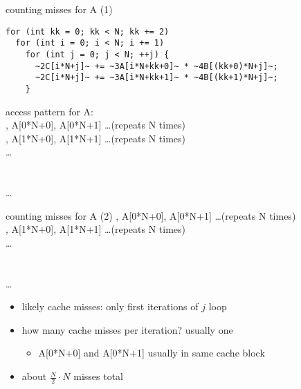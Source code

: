 
\begin{frame}[fragile,label=cacheBlockKLoadsA]{counting misses for A (1)}
\begin{lstlisting}
for (int kk = 0; kk < N; kk += 2)
  for (int i = 0; i < N; i += 1)
    for (int j = 0; j < N; ++j) {
      ~2C[i*N+j]~ += ~3A[i*N+kk+0]~ * ~4B[(kk+0)*N+j]~;
      ~2C[i*N+j]~ += ~3A[i*N+kk+1]~ * ~4B[(kk+1)*N+j]~;
    }
\end{lstlisting}
access pattern for A: \\
, A[0*N+0], A[0*N+1] \ldots (repeats N times) \\
, A[1*N+0], A[1*N+1] \ldots (repeats N times) \\
\ldots \\
 \\
 \\
\ldots 
\end{frame}

\begin{frame}[fragile,label=cacheBlockKLoadsA2]{counting misses for A (2)}
, A[0*N+0], A[0*N+1] \ldots (repeats N times) \\
, A[1*N+0], A[1*N+1] \ldots (repeats N times) \\
\ldots \\
 \\
 \\
\ldots 
\begin{itemize}
\item<2-> likely cache misses: only first iterations of $j$ loop
\item<2-> how many cache misses per iteration? usually one
    \begin{itemize}
    \item A[0*N+0] and A[0*N+1] usually in same cache block
    \end{itemize}
\item<3-> about $\frac{N}{2}\cdot N$ misses total
\end{itemize}
\end{frame}
